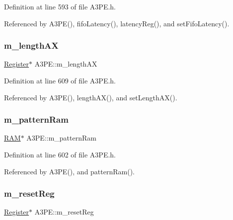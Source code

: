 Definition at line 593 of file A3\+P\+E.\+h.



Referenced by A3\+P\+E(), fifo\+Latency(), latency\+Reg(), and set\+Fifo\+Latency().

\mbox{\label{classA3PE_a87c93a38343873f2d52741deca4750ce}} 
\subsubsection{\texorpdfstring{m\+\_\+length\+AX}{m\_lengthAX}}
{\footnotesize\ttfamily \hyperlink{classRegister}{Register}$\ast$ A3\+P\+E\+::m\+\_\+length\+AX\hspace{0.3cm}{\ttfamily [private]}}



Definition at line 609 of file A3\+P\+E.\+h.



Referenced by A3\+P\+E(), length\+A\+X(), and set\+Length\+A\+X().

\mbox{\label{classA3PE_a84d5deabbbf2d513144dd6a00390182e}} 
\subsubsection{\texorpdfstring{m\+\_\+pattern\+Ram}{m\_patternRam}}
{\footnotesize\ttfamily \hyperlink{classRAM}{R\+AM}$\ast$ A3\+P\+E\+::m\+\_\+pattern\+Ram\hspace{0.3cm}{\ttfamily [private]}}



Definition at line 602 of file A3\+P\+E.\+h.



Referenced by A3\+P\+E(), and pattern\+Ram().

\mbox{\label{classA3PE_ab4db5f00976e5095686f108c8febf702}} 
\subsubsection{\texorpdfstring{m\+\_\+reset\+Reg}{m\_resetReg}}
{\footnotesize\ttfamily \hyperlink{classRegister}{Register}$\ast$ A3\+P\+E\+::m\+\_\+reset\+Reg\hspace{0.3cm}{\ttfamily [private]}}



